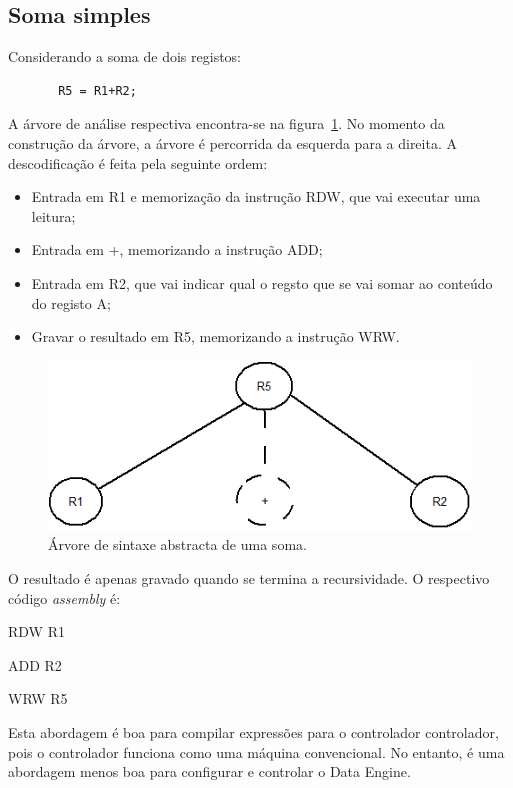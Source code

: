 \subsection{Soma simples}
\label{subsection:Soma simples}

Considerando a soma de dois registos:

\begin{lstlisting} 
       R5 = R1+R2;      
\end{lstlisting}  
    
A árvore de análise respectiva encontra-se na figura~\ref{fig:Arvore_de sintaxe abstracta_de_uma_soma}.
No momento da construção da árvore, a árvore é percorrida da esquerda para a direita. A descodificação é feita pela seguinte ordem:

\begin{itemize}
  \item Entrada em R1 e memorização da instrução RDW, que vai executar uma leitura;
  \item Entrada em +, memorizando a instrução ADD;
  \item Entrada em R2, que vai indicar qual o regsto que se vai somar ao conteúdo do registo A;
  \item Gravar o resultado em R5, memorizando a instrução WRW.
\end{itemize}
    
    \begin{figure}[!htb]
  \centering
  \includegraphics[height=45mm]{Figures/grafo1.png}
  \caption[Árvore lexical de uma soma.]{Árvore de sintaxe abstracta de uma soma.}  
  \label{fig:Arvore_de sintaxe abstracta_de_uma_soma}
\end{figure}
    
    O resultado é apenas gravado quando se termina a recursividade.
O respectivo código {\it assembly} é:

    RDW R1    

    ADD R2

    WRW R5
    
Esta abordagem é boa para compilar expressões para o controlador controlador, pois o controlador funciona como uma máquina convencional. No entanto, 
é uma abordagem menos boa para configurar e controlar o Data Engine.

